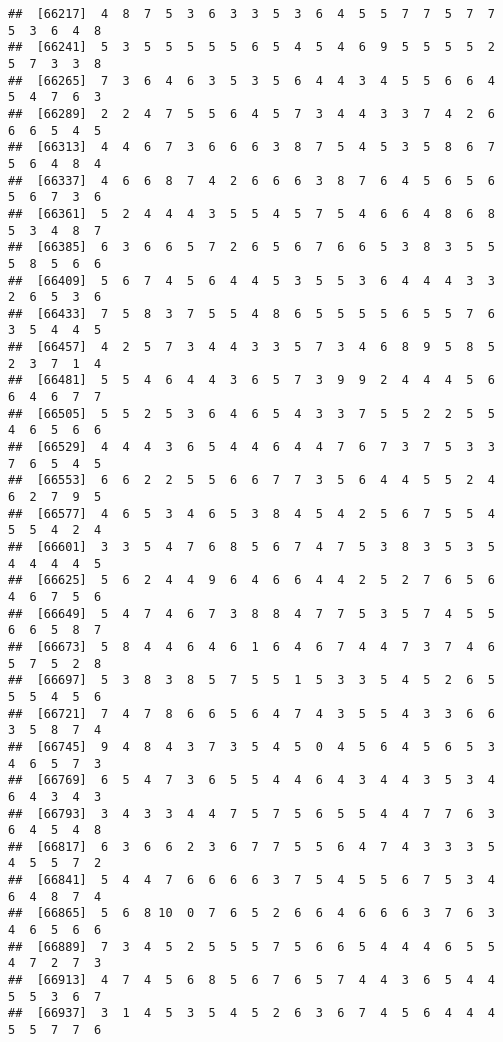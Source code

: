 \documentclass[
]{book}
\begin{document}
\begin{verbatim}
##  [66217]  4  8  7  5  3  6  3  3  5  3  6  4  5  5  7  7  5  7  7  5  3  6  4  8
##  [66241]  5  3  5  5  5  5  5  6  5  4  5  4  6  9  5  5  5  5  2  5  7  3  3  8
##  [66265]  7  3  6  4  6  3  5  3  5  6  4  4  3  4  5  5  6  6  4  5  4  7  6  3
##  [66289]  2  2  4  7  5  5  6  4  5  7  3  4  4  3  3  7  4  2  6  6  6  5  4  5
##  [66313]  4  4  6  7  3  6  6  6  3  8  7  5  4  5  3  5  8  6  7  5  6  4  8  4
##  [66337]  4  6  6  8  7  4  2  6  6  6  3  8  7  6  4  5  6  5  6  5  6  7  3  6
##  [66361]  5  2  4  4  4  3  5  5  4  5  7  5  4  6  6  4  8  6  8  5  3  4  8  7
##  [66385]  6  3  6  6  5  7  2  6  5  6  7  6  6  5  3  8  3  5  5  5  8  5  6  6
##  [66409]  5  6  7  4  5  6  4  4  5  3  5  5  3  6  4  4  4  3  3  2  6  5  3  6
##  [66433]  7  5  8  3  7  5  5  4  8  6  5  5  5  5  6  5  5  7  6  3  5  4  4  5
##  [66457]  4  2  5  7  3  4  4  3  3  5  7  3  4  6  8  9  5  8  5  2  3  7  1  4
##  [66481]  5  5  4  6  4  4  3  6  5  7  3  9  9  2  4  4  4  5  6  6  4  6  7  7
##  [66505]  5  5  2  5  3  6  4  6  5  4  3  3  7  5  5  2  2  5  5  4  6  5  6  6
##  [66529]  4  4  4  3  6  5  4  4  6  4  4  7  6  7  3  7  5  3  3  7  6  5  4  5
##  [66553]  6  6  2  2  5  5  6  6  7  7  3  5  6  4  4  5  5  2  4  6  2  7  9  5
##  [66577]  4  6  5  3  4  6  5  3  8  4  5  4  2  5  6  7  5  5  4  5  5  4  2  4
##  [66601]  3  3  5  4  7  6  8  5  6  7  4  7  5  3  8  3  5  3  5  4  4  4  4  5
##  [66625]  5  6  2  4  4  9  6  4  6  6  4  4  2  5  2  7  6  5  6  4  6  7  5  6
##  [66649]  5  4  7  4  6  7  3  8  8  4  7  7  5  3  5  7  4  5  5  6  6  5  8  7
##  [66673]  5  8  4  4  6  4  6  1  6  4  6  7  4  4  7  3  7  4  6  5  7  5  2  8
##  [66697]  5  3  8  3  8  5  7  5  5  1  5  3  3  5  4  5  2  6  5  5  5  4  5  6
##  [66721]  7  4  7  8  6  6  5  6  4  7  4  3  5  5  4  3  3  6  6  3  5  8  7  4
##  [66745]  9  4  8  4  3  7  3  5  4  5  0  4  5  6  4  5  6  5  3  4  6  5  7  3
##  [66769]  6  5  4  7  3  6  5  5  4  4  6  4  3  4  4  3  5  3  4  6  4  3  4  3
##  [66793]  3  4  3  3  4  4  7  5  7  5  6  5  5  4  4  7  7  6  3  6  4  5  4  8
##  [66817]  6  3  6  6  2  3  6  7  7  5  5  6  4  7  4  3  3  3  5  4  5  5  7  2
##  [66841]  5  4  4  7  6  6  6  6  3  7  5  4  5  5  6  7  5  3  4  6  4  8  7  4
##  [66865]  5  6  8 10  0  7  6  5  2  6  6  4  6  6  6  3  7  6  3  4  6  5  6  6
##  [66889]  7  3  4  5  2  5  5  5  7  5  6  6  5  4  4  4  6  5  5  4  7  2  7  3
##  [66913]  4  7  4  5  6  8  5  6  7  6  5  7  4  4  3  6  5  4  4  5  5  3  6  7
##  [66937]  3  1  4  5  3  5  4  5  2  6  3  6  7  4  5  6  4  4  4  5  5  7  7  6

\end{verbatim}
\end{document}

